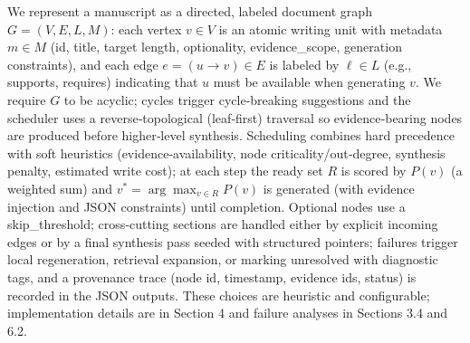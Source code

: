We represent a manuscript as a directed, labeled document graph $G=(V,E,L,M)$: each vertex $v\in V$ is an atomic writing unit with metadata $m\in M$ (id, title, target length, optionality, evidence\_scope, generation constraints), and each edge $e=(u\!\rightarrow\!v)\in E$ is labeled by $\ell\in L$ (e.g., supports, requires) indicating that $u$ must be available when generating $v$.  
We require $G$ to be acyclic; cycles trigger cycle‑breaking suggestions and the scheduler uses a reverse‑topological (leaf‑first) traversal so evidence‑bearing nodes are produced before higher‑level synthesis.  
Scheduling combines hard precedence with soft heuristics (evidence‑availability, node criticality/out‑degree, synthesis penalty, estimated write cost); at each step the ready set $R$ is scored by $P(v)$ (a weighted sum) and $v^*=\arg\max_{v\in R}P(v)$ is generated (with evidence injection and JSON constraints) until completion.  
Optional nodes use a skip\_threshold; cross‑cutting sections are handled either by explicit incoming edges or by a final synthesis pass seeded with structured pointers; failures trigger local regeneration, retrieval expansion, or marking unresolved with diagnostic tags, and a provenance trace (node id, timestamp, evidence ids, status) is recorded in the JSON outputs.  
These choices are heuristic and configurable; implementation details are in Section 4 and failure analyses in Sections 3.4 and 6.2.
